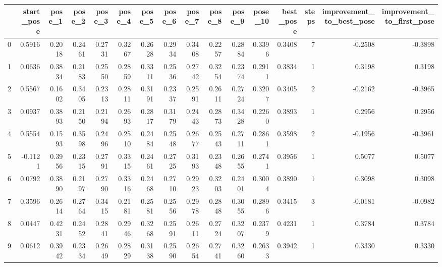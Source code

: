 \begin{tabular}{lrrrrrrrrrrrrrrr}
\toprule
{} &  start\_pose &  pose\_1 &  pose\_2 &  pose\_3 &  pose\_4 &  pose\_5 &  pose\_6 &  pose\_7 &  pose\_8 &  pose\_9 &  pose\_10 &  best\_pose &  steps &  improvement\_to\_best\_pose &  improvement\_to\_first\_pose \\
\midrule
0 &      0.5916 &  0.2018 &  0.2461 &  0.2731 &  0.3267 &  0.2628 &  0.2934 &  0.3408 &  0.2257 &  0.2884 &   0.3396 &     0.3408 &      7 &                   -0.2508 &                    -0.3898 \\
1 &      0.0636 &  0.3834 &  0.2183 &  0.2550 &  0.2859 &  0.3311 &  0.2536 &  0.2742 &  0.3254 &  0.2374 &   0.2911 &     0.3834 &      1 &                    0.3198 &                     0.3198 \\
2 &      0.5567 &  0.1602 &  0.3405 &  0.2313 &  0.2811 &  0.3191 &  0.2337 &  0.2591 &  0.2611 &  0.2724 &   0.3207 &     0.3405 &      2 &                   -0.2162 &                    -0.3965 \\
3 &      0.0937 &  0.3893 &  0.2150 &  0.2194 &  0.2693 &  0.2817 &  0.3179 &  0.2443 &  0.2873 &  0.3428 &   0.2260 &     0.3893 &      1 &                    0.2956 &                     0.2956 \\
4 &      0.5554 &  0.1593 &  0.3598 &  0.2496 &  0.2510 &  0.2484 &  0.2548 &  0.2677 &  0.2543 &  0.2711 &   0.2861 &     0.3598 &      2 &                   -0.1956 &                    -0.3961 \\
5 &     -0.1121 &  0.3956 &  0.2315 &  0.2791 &  0.3315 &  0.2461 &  0.2725 &  0.3193 &  0.2348 &  0.2655 &   0.2741 &     0.3956 &      1 &                    0.5077 &                     0.5077 \\
6 &      0.0792 &  0.3890 &  0.2197 &  0.2790 &  0.3316 &  0.2468 &  0.2710 &  0.2923 &  0.3203 &  0.2401 &   0.3004 &     0.3890 &      1 &                    0.3098 &                     0.3098 \\
7 &      0.3596 &  0.2614 &  0.2764 &  0.3415 &  0.2181 &  0.2581 &  0.2556 &  0.2978 &  0.2848 &  0.3055 &   0.2896 &     0.3415 &      3 &                   -0.0181 &                    -0.0982 \\
8 &      0.0447 &  0.4231 &  0.2452 &  0.2841 &  0.2946 &  0.3268 &  0.2591 &  0.2611 &  0.2724 &  0.3207 &   0.2379 &     0.4231 &      1 &                    0.3784 &                     0.3784 \\
9 &      0.0612 &  0.3942 &  0.2334 &  0.2649 &  0.2829 &  0.3138 &  0.2590 &  0.2654 &  0.2741 &  0.3260 &   0.2633 &     0.3942 &      1 &                    0.3330 &                     0.3330 \\
\bottomrule
\end{tabular}
